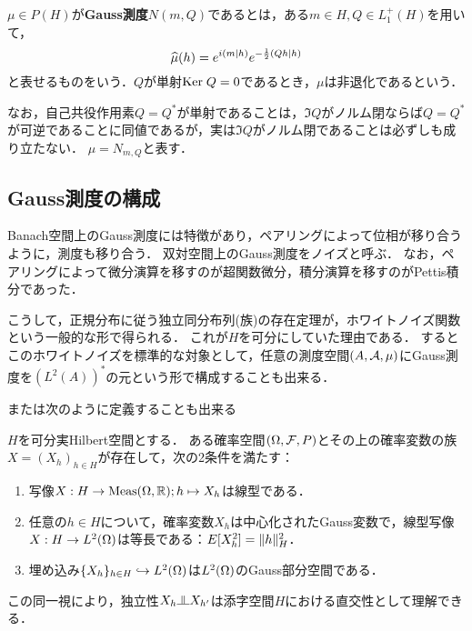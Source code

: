 \documentclass[uplatex,dvipdfmx]{jsreport}
\begin{document}
\begin{definition}
    $\mu\in P(H)$が\textbf{Gauss測度$N(m,Q)$}であるとは，ある$m\in H,Q\in L^+_1(H)$を用いて，
    \[\widehat{\mu}(h)=e^{i(m|h)}e^{-\frac{1}{2}(Qh|h)}\]
    と表せるものをいう．$Q$が単射$\mathrm{Ker}\; Q=0$であるとき，$\mu$は非退化であるという．

    なお，自己共役作用素$Q=Q^*$が単射であることは，$\Im Q$がノルム閉ならば$Q=Q^*$が可逆であることに同値であるが，実は$\Im Q$がノルム閉であることは必ずしも成り立たない．
    $\mu=N_{m,Q}$と表す．
\end{definition}

\subsection{Gauss測度の構成}

\begin{tcolorbox}[colframe=ForestGreen, colback=ForestGreen!10!white,breakable,colbacktitle=ForestGreen!40!white,coltitle=black,fonttitle=\bfseries\sffamily,
title=]
    Banach空間上のGauss測度には特徴があり，ペアリングによって位相が移り合うように，測度も移り合う．
    双対空間上のGauss測度をノイズと呼ぶ．
    なお，ペアリングによって微分演算を移すのが超関数微分，積分演算を移すのがPettis積分であった．

    こうして，正規分布に従う独立同分布列(族)の存在定理が，ホワイトノイズ関数という一般的な形で得られる．
    これが$H$を可分にしていた理由である．
    するとこのホワイトノイズを標準的な対象として，任意の測度空間$(A,\mathcal{A},\mu)$にGauss測度を$(L^2(A))^*$の元という形で構成することも出来る．
\end{tcolorbox}

または次のように定義することも出来る\cite{Revus and Yor}

\begin{proposition}
    $H$を可分実Hilbert空間とする．
    ある確率空間$(\Omega,\mathcal{F},P)$とその上の確率変数の族$X=(X_h)_{h\in H}$が存在して，次の2条件を満たす：
    \begin{enumerate}
        \item 写像$X:H\to\mathrm{Meas}(\Omega,\mathbb{R});h\mapsto X_h$は線型である．
        \item 任意の$h\in H$について，確率変数$X_h$は中心化されたGauss変数で，線型写像$X:H\to L^2(\Omega)$は等長である：$E[X_h^2]=\|h\|^2_H$．
        \item 埋め込み$\{X_h\}_{h\in H}\hookrightarrow L^2(\Omega)$は$L^2(\Omega)$のGauss部分空間である．
    \end{enumerate}
\end{proposition}
\begin{remark}
    この同一視により，独立性$X_h\indep X_{h'}$は添字空間$H$における直交性として理解できる．
\end{remark}
\end{document}
